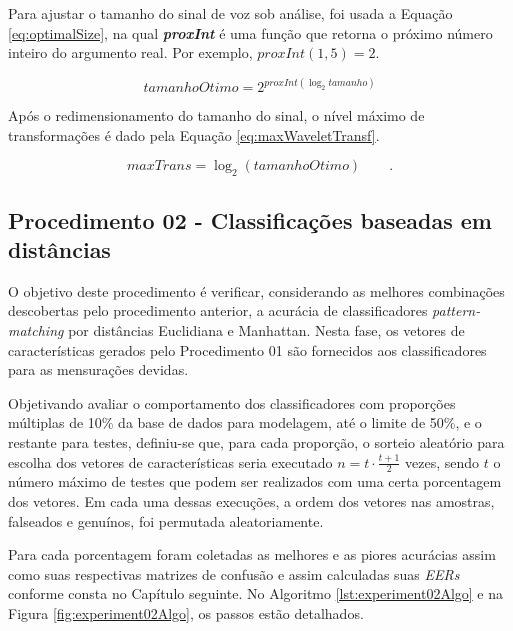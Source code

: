 		\par Para ajustar o tamanho do sinal de voz sob análise, foi usada a Equação \ref{eq:optimalSize}, na qual \textit{\textbf{proxInt}} é uma função que retorna o próximo número inteiro do argumento real. Por exemplo, $proxInt(1,5) = 2$.

		\begin{equation}
					tamanhoOtimo=2^{proxInt(\log_{2}tamanho)}
					\label{eq:optimalSize}
		\end{equation} 
		
		\par Após o redimensionamento do tamanho do sinal, o nível máximo de transformações é dado pela Equação \ref{eq:maxWaveletTransf}. 
				
		\begin{equation}
					maxTrans=\log_{2}(tamanhoOtimo) \qquad.
					\label{eq:maxWaveletTransf}
		\end{equation}
		
		\subsection{Procedimento 02 - Classificações baseadas em distâncias}
		\label{chap:propApproach:sec:Experimento02}
		\par O objetivo deste procedimento é verificar, considerando as melhores combinações descobertas pelo procedimento anterior, a acurácia de classificadores \textit{pattern-matching} por distâncias Euclidiana e Manhattan. Nesta fase, os vetores de características gerados pelo Procedimento 01 são fornecidos aos classificadores para as mensurações devidas.
				
		\par Objetivando avaliar o comportamento dos classificadores com proporções múltiplas de 10\% da base de dados para modelagem, até o limite de 50\%, e o restante para testes, definiu-se que, para cada proporção, o sorteio aleatório para escolha dos vetores de características seria executado $n=t \cdot \frac{t+1}{2}$ vezes, sendo $t$ o número máximo de testes que podem ser realizados com uma certa porcentagem dos vetores. Em cada uma dessas execuções, a ordem dos vetores nas amostras, falseados e genuínos, foi permutada aleatoriamente.
				
		\par Para cada porcentagem foram coletadas as melhores e as piores acurácias assim como suas respectivas matrizes de confusão e assim calculadas suas \textit{EERs} conforme consta no Capítulo seguinte. No Algoritmo \ref{lst:experiment02Algo} e na Figura \ref{fig:experiment02Algo}, os passos estão detalhados.
		
